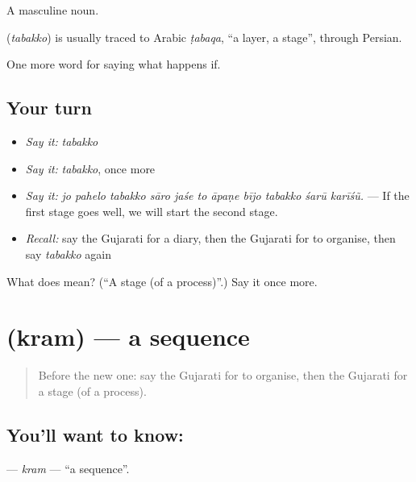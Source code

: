 A masculine noun.

\begin{cousinweb}
\textbf{} (\emph{tabakko}) is usually traced to Arabic \emph{ṭabaqa}, \textquotedblleft{}a layer, a stage\textquotedblright{}, through Persian.
\end{cousinweb}

\begin{grammarlens}[title={What you've built}]
One more word for saying what happens if.
\end{grammarlens}

\subsection*{Your turn}
\begin{itemize}
\raggedright
  \item \emph{Say it:} \emph{tabakko}
  \item \emph{Say it:} \emph{tabakko}, once more
  \item \emph{Say it:} \emph{jo pahelo tabakko sāro jaśe to āpaṇe bījo tabakko śarū karīśũ.} — If the first stage goes well, we will start the second stage.
  \item \emph{Recall:} say the Gujarati for a diary, then the Gujarati for to organise, then say \emph{tabakko} again
\end{itemize}

\begin{tcolorbox}[breakable,colback=teal!4,colframe=teal!35!black,title={Before you move on}]
What does  mean? (\textquotedblleft{}A stage (of a process)\textquotedblright{}.) Say it once more.
\end{tcolorbox}
\section[\texorpdfstring{\gu{ક્રમ} (kram)}{ક્રમ (kram)}]{ (kram) — a sequence}

\label{lesson:GU-C529-kram}



\begin{quote}
Before the new one: say the Gujarati for to organise, then the Gujarati for a stage (of a process).
\end{quote}

\subsection*{You'll want to know: }
\textbf{} — \emph{kram} — \textquotedblleft{}a sequence\textquotedblright{}.

